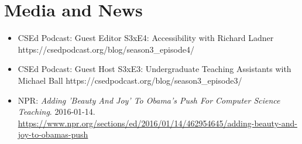 \section{Media and News}

\vspace{6pt}

\begin{itemize}

  \setlength\itemsep{1em}

    \item{CSEd Podcast: Guest Editor\newline
    S3xE4: Accessibility with Richard Ladner
    \newline
    \footnotesize https://csedpodcast.org/blog/season3\_episode4/}
    
    \item{CSEd Podcast: Guest Host \newline
    S3xE3: Undergraduate Teaching Assistants with Michael Ball
    \newline
    \footnotesize https://csedpodcast.org/blog/season3\_episode3/}
    

    \item{NPR: \textit{Adding 'Beauty And Joy' To Obama's Push For Computer Science Teaching}. 2016-01-14.}
    \newline
    \footnotesize{\href{https://www.npr.org/sections/ed/2016/01/14/462954645/adding-beauty-and-joy-to-obamas-push}{https://www.npr.org/sections/ed/2016/01/14/462954645/adding-beauty-and-joy-to-obamas-push}}

\end{itemize}

\vspace{2pt}